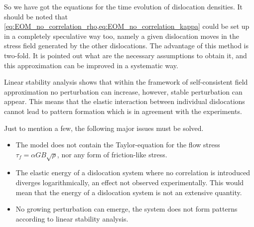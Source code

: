 So we have got the equations for the time evolution of dislocation densities. It should be noted that \cref{eq:EOM_no_correlation_rho,eq:EOM_no_correlation_kappa} could be set up in a completely speculative way too, namely a given dislocation moves in the stress field generated by the other dislocations. The advantage of this method is two-fold. It is pointed out what are the necessary assumptions to obtain it, and this approximation can be improved in a systematic way.

Linear stability analysis shows that within the framework of self-consistent field approximation no perturbation can increase, however, stable perturbation can appear. This means that the elastic interaction between individual dislocations cannot lead to pattern formation which is in agreement with the experiments.

Just to mention a few, the following major issues must be solved.
\begin{itemize}
\item The model does not contain the Taylor-equation for the flow stress ${\tau _f} = \alpha GB\sqrt \rho  $, nor any form of friction-like stress.
\item The elastic energy of a dislocation system where no correlation is introduced diverges logarithmically, an effect not observed experimentally. This would mean that the energy of a dislocation system is not an extensive quantity.
\item No growing perturbation can emerge, the system does not form patterns according to linear stability analysis.
\end{itemize}

